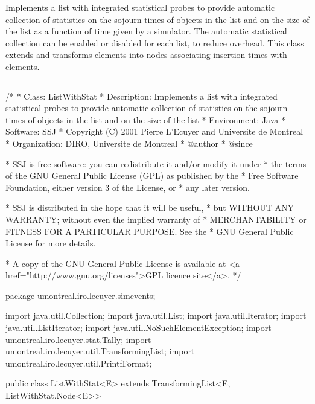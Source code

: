 
Implements a list with integrated statistical
probes to provide automatic collection of
statistics on the sojourn times of objects in the list and on the
size of the list as a function of time given by a simulator.
The automatic statistical collection can be
enabled or disabled for each list, to reduce overhead.
This class extends 
and transforms elements into nodes associating insertion times with elements.

\bigskip\hrule


\begin{code}
\begin{hide}
/*
 * Class:        ListWithStat
 * Description:  Implements a list with integrated statistical probes to
                 provide automatic collection of statistics on the sojourn
                 times of objects in the list and on the size of the list
 * Environment:  Java
 * Software:     SSJ
 * Copyright (C) 2001  Pierre L'Ecuyer and Universite de Montreal
 * Organization: DIRO, Universite de Montreal
 * @author
 * @since

 * SSJ is free software: you can redistribute it and/or modify it under
 * the terms of the GNU General Public License (GPL) as published by the
 * Free Software Foundation, either version 3 of the License, or
 * any later version.

 * SSJ is distributed in the hope that it will be useful,
 * but WITHOUT ANY WARRANTY; without even the implied warranty of
 * MERCHANTABILITY or FITNESS FOR A PARTICULAR PURPOSE.  See the
 * GNU General Public License for more details.

 * A copy of the GNU General Public License is available at
   <a href="http://www.gnu.org/licenses">GPL licence site</a>.
 */
\end{hide}
package umontreal.iro.lecuyer.simevents;\begin{hide}
import java.util.Collection;
import java.util.List;
import java.util.Iterator;
import java.util.ListIterator;
import java.util.NoSuchElementException;
import umontreal.iro.lecuyer.stat.Tally;
import umontreal.iro.lecuyer.util.TransformingList;
import umontreal.iro.lecuyer.util.PrintfFormat;
\end{hide}

public class ListWithStat<E>
             extends TransformingList<E, ListWithStat.Node<E>>\begin{hide} {
   private boolean stats; // true si on a appele setStatCollecting
   private double initTime; // temps de la derniere initialisation
   private Accumulate blockSize; //block stat. sur la longueur de la liste
   private Tally blockSojourn; // block stat. sur les durees de sejour
   private String name;
   private Simulator sim;
\end{hide}
\end{code}

